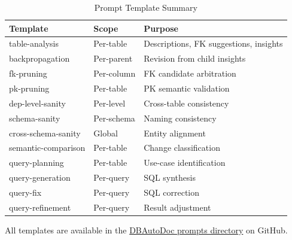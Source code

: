 \documentclass[twocolumn]{svjour3}
\begin{document}
\begin{table}[htbp]
\caption{Prompt Template Summary}
\label{tab:prompts}
\centering
\begin{tabular}{llp{3.5cm}}
\toprule
\textbf{Template} & \textbf{Scope} & \textbf{Purpose} \\
\midrule
table-analysis & Per-table & Descriptions, FK suggestions, insights \\
backpropagation & Per-parent & Revision from child insights \\
fk-pruning & Per-column & FK candidate arbitration \\
pk-pruning & Per-table & PK semantic validation \\
dep-level-sanity & Per-level & Cross-table consistency \\
schema-sanity & Per-schema & Naming consistency \\
cross-schema-sanity & Global & Entity alignment \\
semantic-comparison & Per-table & Change classification \\
query-planning & Per-table & Use-case identification \\
query-generation & Per-query & SQL synthesis \\
query-fix & Per-query & SQL correction \\
query-refinement & Per-query & Result adjustment \\
\bottomrule
\end{tabular}
\end{table}

All templates are available in the \href{https://github.com/MemberJunction/MJ/tree/next/packages/DBAutoDoc/src/prompts}{DBAutoDoc prompts directory} on GitHub.


\clearpage


\end{document}
